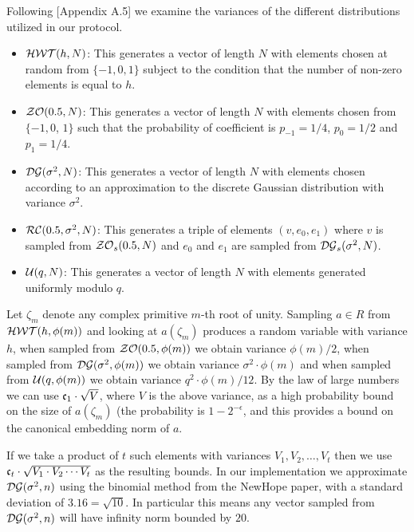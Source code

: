 Following \cite{GHS12c}[Appendix A.5] we examine the variances
of the different distributions utilized in our protocol.
\begin{itemize}
\item $\mathcal{HWT}(h,N)$: This generates a vector of length $N$
      with elements chosen at random from $\{-1,0,1\}$ subject to
      the condition that the number of non-zero elements is equal to $h$.
\item $\mathcal{ZO}(0.5,N)$:  This generates a vector of length $N$
      with elements chosen from $\{-1,0$, $1\}$ such that the
      probability of coefficient is $p_{-1}=1/4$, $p_0=1/2$
      and $p_1=1/4$.
\item $\mathcal{DG}(\sigma^2,N)$: This generates a vector of
      length $N$ with elements chosen according to an approximation to
      the discrete Gaussian distribution with variance $\sigma^2$.
\item $\mathcal{RC}(0.5,\sigma^2,N)$: This generates a triple of
      elements $(v,e_0,e_1)$ where $v$ is sampled from $\mathcal{ZO}_s(0.5,N)$
      and $e_0$ and $e_1$ are sampled from $\mathcal{DG}_s(\sigma^2,N)$.
\item $\mathcal{U}(q,N)$: This generates a vector of length $N$ 
      with elements generated uniformly modulo $q$.
\end{itemize}
Let $\zeta_m$ denote any complex primitive $m$-th root of unity.
Sampling $a \in R$ from $\mathcal{HWT}(h,\phi(m))$ and looking at $a(\zeta_m)$
produces a random variable with variance $h$, when sampled
from $\mathcal{ZO}(0.5,\phi(m))$ we obtain variance $\phi(m)/2$,
when sampled from $\mathcal{DG}(\sigma^2,\phi(m))$ we obtain variance
$\sigma^2 \cdot \phi(m)$ and when sampled from $\mathcal{U}(q,\phi(m))$
we obtain variance $q^2 \cdot \phi(m)/12$.
By the law of large numbers we can use $\mathfrak{c}_1 \cdot \sqrt{V}$,
where $V$ is the above variance, as a high probability bound
on the size of $a(\zeta_m)$ (the probability is $1-2^{-\epsilon}$, 
and this provides a bound on the canonical embedding norm of $a$.

If we take a product of $t$ such
elements with variances $V_1, V_2, \ldots, V_t$
then we use $\mathfrak{c}_t \cdot \sqrt{V_1 \cdot V_2 \cdots V_t}$
as the resulting bounds.
In our implementation we approximate $\mathcal{DG}(\sigma^2,n)$ using
the binomial method from the NewHope paper, with a standard
deviation of $3.16 = \sqrt{10}$. In particular this means
any vector sampled from $\mathcal{DG}(\sigma^2,n)$ will have
infinity norm bounded by $20$.



